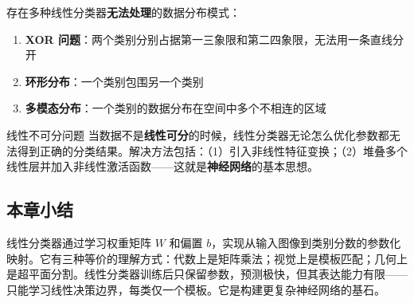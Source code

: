 存在多种线性分类器\textbf{无法处理}的数据分布模式：

\begin{enumerate}
    \item \textbf{XOR 问题}：两个类别分别占据第一三象限和第二四象限，无法用一条直线分开
    \item \textbf{环形分布}：一个类别包围另一个类别
    \item \textbf{多模态分布}：一个类别的数据分布在空间中多个不相连的区域
\end{enumerate}

\begin{warningbox}{线性不可分问题}
当数据不是\textbf{线性可分}的时候，线性分类器无论怎么优化参数都无法得到正确的分类结果。解决方法包括：（1）引入非线性特征变换；（2）堆叠多个线性层并加入非线性激活函数——这就是\textbf{神经网络}的基本思想。
\end{warningbox}

\subsection{本章小结}

线性分类器通过学习权重矩阵 $W$ 和偏置 $b$，实现从输入图像到类别分数的参数化映射。它有三种等价的理解方式：代数上是矩阵乘法；视觉上是模板匹配；几何上是超平面分割。线性分类器训练后只保留参数，预测极快，但其表达能力有限——只能学习线性决策边界，每类仅一个模板。它是构建更复杂神经网络的基石。


